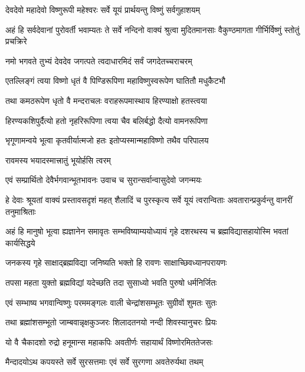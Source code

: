 \twolineshloka
{देवदेवो महादेवो विष्णुरूपी महेश्वरः}
{सर्वे यूयं प्रार्थयन्तु विष्णुं सर्वगुहाशयम्}%

\threelineshloka
{अहं हि सर्वदेवानां पुरोवर्ती भवाम्यतः}
{ते सर्वे नन्दिनो वाक्यं श्रुत्वा मुदितमानसाः}
{वैकुण्ठमागता गीर्भिर्विष्णुं स्तोतुं प्रचक्रिरे}%


\twolineshloka
{नमो भगवते तुभ्यं देवदेव जगत्पते}
{त्वदाधारमिदं सर्वं जगदेतच्चराचरम्}%

\twolineshloka
{एतल्लिङ्गं त्वया विष्णो धृतं वै पिण्डिरूपिणा}
{महाविष्णुस्वरूपेण घातितौ मधुकैटभौ}%

\twolineshloka
{तथा कमठरूपेण धृतो वै मन्दराचलः}
{वराहरूपमास्थाय हिरण्याक्षो हतस्त्वया}%

\twolineshloka
{हिरण्यकशिपुर्दैत्यो हतो नृहरिरूपिणा}
{त्वया चैव बलिर्बद्धो दैत्यो वामनरूपिणा}%

\twolineshloka
{भृगूणामन्वये भूत्वा कृतवीर्यात्मजो हतः}
{इतोप्यस्मान्महाविष्णो तथैव परिपालय}%

\onelineshloka
{रावमस्य भयादस्मात्त्रातुं भूयोर्हसि त्वरम्}%

\twolineshloka
{एवं सम्प्रार्थितो देवैर्भगवान्भूतभावनः}
{उवाच च सुरान्सर्वान्वासुदेवो जगन्मयः}%

\threelineshloka
{हे देवाः श्रूयतां वाक्यं प्रस्तावसदृशं महत्}
{शैलादिं च पुरस्कृत्य सर्वे यूयं त्वरान्विताः}
{अवतारान्प्रकुर्वन्तु वानरीं तनुमाश्रिताः}%

\threelineshloka
{अहं हि मानुषो भूत्वा ह्यज्ञानेन समावृतः}
{सम्भविष्याम्ययोध्यायं गृहे दशरथस्य च}
{ब्रह्मविद्यासहायोस्मि भवतां कार्यसिद्धये}%

\twolineshloka
{जनकस्य गृहे साक्षाद्ब्रह्मविद्या जनिष्यति}
{भक्तो हि रावणः साक्षाच्छिवध्यानपरायणः}%

\twolineshloka
{तपसा महता युक्तो ब्रह्मविद्यां यदेच्छति}
{तदा सुसाध्यो भवति पुरुषो धर्मनिर्जितः}%

\twolineshloka
{एवं सम्भाष्य भगवान्विष्णुः परममङ्गलः}
{वाली चेन्द्रांशसम्भूतः सुग्रीवों शुमतः सुतः}%

\twolineshloka
{तथा ब्रह्मांशसम्भूतो जाम्बवान्नृक्षकुञ्जरः}
{शिलादतनयो नन्दी शिवस्यानुचरः प्रियः}%

\twolineshloka
{यो वै चैकादशो रुद्रो हनूमान्स महाकपिः}
{अवतीर्णः सहायार्थं विष्णोरमिततेजसः}%

\twolineshloka
{मैन्दादयोऽथ कपयस्ते सर्वे सुरसत्तमाः}
{एवं सर्वे सुरगणा अवतेरुर्यथा तथम्}%

